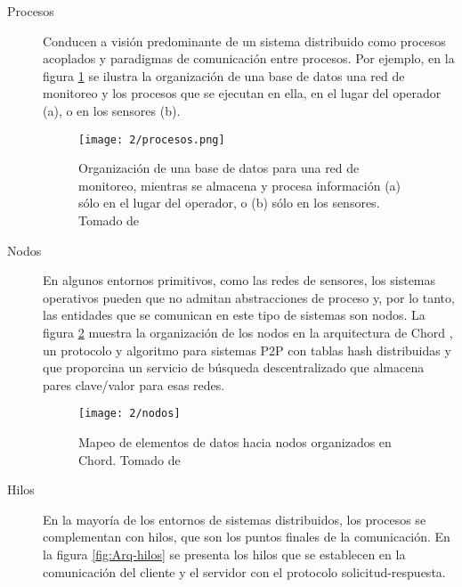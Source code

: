 \begin{description}	
	\item [Procesos] Conducen a visión  predominante de un sistema distribuido como \gls{procesos} acoplados y paradigmas de comunicación entre procesos.  
	Por ejemplo, en la figura \ref{fig:Arq-procesos} se ilustra la organización de una base de datos una red de monitoreo y los procesos que se ejecutan en ella, en el lugar del operador (a), o en los sensores (b). 
	
	\begin{figure}%
		\texttt{[image: 2/procesos.png]}
		\caption{Organización de una base de datos para una red de monitoreo, 	mientras se almacena y procesa información (a) sólo en el lugar del operador, 	o (b) sólo en los sensores. Tomado de \TA}
		\label{fig:Arq-procesos}
	\end{figure}
	
	\item [Nodos]  En algunos entornos primitivos, como las redes de sensores,  los sistemas operativos pueden que no admitan abstracciones de proceso  y, por lo tanto, las entidades que se comunican en este tipo de sistemas son \gls{nodos}. 
	La figura \ref{fig:Arq-nodos} muestra la organización de los nodos en la arquitectura de Chord , un protocolo y algoritmo para sistemas P2P con \gls{tablas hash distribuidas}   y que proporcina un servicio de búsqueda descentralizado que almacena pares clave/valor para esas redes. 
	
 	
	
	\begin{figure}%
		\texttt{[image: 2/nodos]}
		\caption{Mapeo de elementos de datos hacia nodos organizados en Chord. Tomado de \TA }
		\label{fig:Arq-nodos}
	\end{figure}
		
	\item [Hilos] En la mayoría de los entornos de sistemas distribuidos, los procesos se complementan con \gls{hilos}, que  son los puntos finales de la comunicación. 
	En la figura {\ref{fig:Arq-hilos}} se presenta   los hilos  que se establecen en la  comunicaci\'on del cliente y el servidor con el \gls{protocolo solicitud-respuesta}.
	

\end{description}
